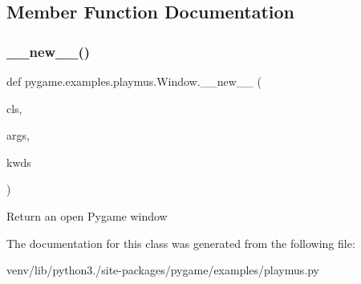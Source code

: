 \subsection{Member Function Documentation}
\mbox{\label{classpygame_1_1examples_1_1playmus_1_1_window_ab80824dac7d8beb35463235d3b48ec82}} 
\subsubsection{\texorpdfstring{\+\_\+\+\_\+new\+\_\+\+\_\+()}{\_\_new\_\_()}}
{\footnotesize\ttfamily def pygame.\+examples.\+playmus.\+Window.\+\_\+\+\_\+new\+\_\+\+\_\+ (\begin{DoxyParamCaption}\item[{}]{cls,  }\item[{}]{args,  }\item[{}]{kwds }\end{DoxyParamCaption})}

\begin{DoxyVerb}Return an open Pygame window\end{DoxyVerb}
 

The documentation for this class was generated from the following file\+:\begin{DoxyCompactItemize}
\item 
venv/lib/python3./site-\/packages/pygame/examples/playmus.\+py\end{DoxyCompactItemize}
